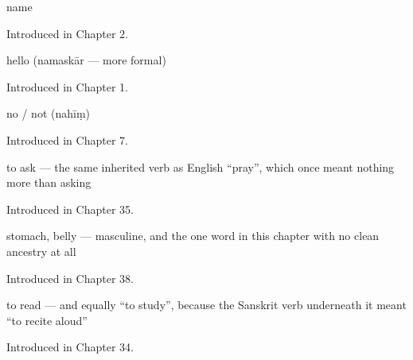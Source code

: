 \noindent\begin{minipage}[t]{\linewidth}
\raggedright
\textbf{}\par
\small name\par
\footnotesize Introduced in Chapter 2.
\end{minipage}\par\medskip

\noindent\begin{minipage}[t]{\linewidth}
\raggedright
\textbf{}\par
\small hello (namaskār — more formal)\par
\footnotesize Introduced in Chapter 1.
\end{minipage}\par\medskip

\noindent\begin{minipage}[t]{\linewidth}
\raggedright
\textbf{}\par
\small no / not (nahīṃ)\par
\footnotesize Introduced in Chapter 7.
\end{minipage}\par\medskip

\noindent\begin{minipage}[t]{\linewidth}
\raggedright
\textbf{}\par
\small to ask — the same inherited verb as English \textquotedblleft{}pray\textquotedblright{}, which once meant nothing more than asking\par
\footnotesize Introduced in Chapter 35.
\end{minipage}\par\medskip

\noindent\begin{minipage}[t]{\linewidth}
\raggedright
\textbf{}\par
\small stomach, belly — masculine, and the one word in this chapter with no clean ancestry at all\par
\footnotesize Introduced in Chapter 38.
\end{minipage}\par\medskip

\noindent\begin{minipage}[t]{\linewidth}
\raggedright
\textbf{}\par
\small to read — and equally \textquotedblleft{}to study\textquotedblright{}, because the Sanskrit verb underneath it meant \textquotedblleft{}to recite aloud\textquotedblright{}\par
\footnotesize Introduced in Chapter 34.
\end{minipage}\par\medskip

